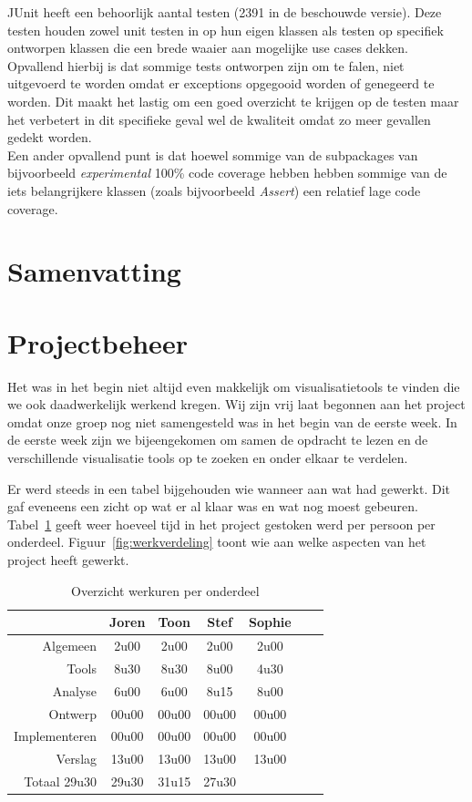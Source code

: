 \documentclass[i1]{oss}
\begin{document}
JUnit heeft een behoorlijk aantal testen (2391 in de beschouwde versie). Deze testen houden zowel unit testen in op hun eigen klassen als testen op specifiek ontworpen klassen die een brede waaier aan mogelijke use cases dekken.
\\
Opvallend hierbij is dat sommige tests ontworpen zijn om te falen, niet uitgevoerd te worden omdat er exceptions opgegooid worden of genegeerd te worden. Dit maakt het lastig om een goed overzicht te krijgen op de testen maar het verbetert in dit specifieke geval wel de kwaliteit omdat zo meer gevallen gedekt worden.
\\
Een ander opvallend punt is dat hoewel sommige van de subpackages van bijvoorbeeld \emph{experimental} 100\% code coverage hebben hebben sommige van de iets belangrijkere klassen (zoals bijvoorbeeld \emph{Assert}) een relatief lage code coverage.

\section{Samenvatting}

\section{Projectbeheer}

Het was in het begin niet altijd even makkelijk om visualisatietools te vinden die we ook daadwerkelijk werkend kregen.
Wij zijn vrij laat begonnen aan het project omdat onze groep nog niet samengesteld was in het begin van de eerste week. In de eerste week zijn we bijeengekomen om samen de opdracht te lezen en de verschillende visualisatie tools op te zoeken en onder elkaar te verdelen. 

Er werd steeds in een tabel bijgehouden wie wanneer aan wat had gewerkt. Dit gaf eveneens een zicht op wat er al klaar was en wat nog moest gebeuren. \\
Tabel~\ref{tab:werkuren} geeft weer hoeveel tijd in het project gestoken werd per persoon per onderdeel. Figuur~\ref{fig:werkverdeling} toont wie aan welke aspecten van het project heeft gewerkt.

\begin{table}[h]
\begin{center}
    \begin{tabular}{ r | c  c  c  c  c  c}
     & Joren & Toon & Stef & Sophie \\ \hline
    Algemeen & 2u00 & 2u00 & 2u00 & 2u00\\
   	Tools & 8u30 & 8u30 & 8u00 & 4u30 \\
	Analyse & 6u00 & 6u00 & 8u15 & 8u00 \\
	Ontwerp & 00u00 & 00u00 & 00u00 & 00u00 \\
	Implementeren & 00u00 & 00u00 & 00u00 & 00u00\\
	Verslag & 13u00 & 13u00 & 13u00 & 13u00 \\
	Totaal 29u30 & 29u30 & 31u15 & 27u30  
    \end{tabular}
    \caption{Overzicht werkuren per onderdeel}
    \label{tab:werkuren}
\end{center}
\end{table}
\end{document}
